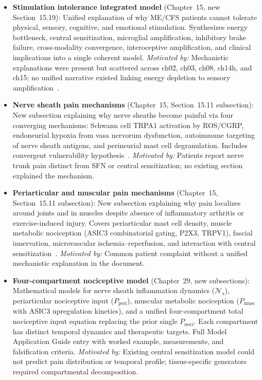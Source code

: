 \begin{itemize}
  \item \textbf{Stimulation intolerance integrated model} (Chapter~15, new
    Section~15.19): Unified explanation of why ME/CFS patients cannot tolerate
    physical, sensory, cognitive, and emotional stimulation. Synthesizes energy
    bottleneck, central sensitization, microglial amplification, inhibitory brake
    failure, cross-modality convergence, interoceptive amplification, and clinical
    implications into a single coherent model.
    \textit{Motivated by:} Mechanistic explanations were present but scattered
    across ch02, ch03, ch08, ch14h, and ch15; no unified narrative existed linking
    energy depletion to sensory
    amplification~\cite{RenzPolster2022,Nijs2017neuroinflammation,Baraniuk2025NociplasticMECFS}.

  \item \textbf{Nerve sheath pain mechanisms} (Chapter~15,
    Section~15.11 subsection): New subsection explaining why nerve sheaths become
    painful via four converging mechanisms: Schwann cell TRPA1 activation by
    ROS/CGRP, endoneurial hypoxia from vasa nervorum dysfunction, autoimmune
    targeting of nerve sheath antigens, and perineurial mast cell degranulation.
    Includes convergent vulnerability
    hypothesis~\cite{heng2025mecfs,Oaklander2016autoimmuneSFN,Oaklander2022SFN}.
    \textit{Motivated by:} Patients report nerve trunk pain distinct from SFN or
    central sensitization; no existing section explained the mechanism.

  \item \textbf{Periarticular and muscular pain mechanisms} (Chapter~15,
    Section~15.11 subsection): New subsection explaining why pain localizes around
    joints and in muscles despite absence of inflammatory arthritis or
    exercise-induced injury. Covers periarticular mast cell density, muscle
    metabolic nociception (ASIC3 combinatorial gating, P2X3, TRPV1), fascial
    innervation, microvascular ischemia--reperfusion, and interaction with central
    sensitization~\cite{Lien2019lactate,Jammes2021muscle,Nijs2012painCFS}.
    \textit{Motivated by:} Common patient complaint without a unified mechanistic
    explanation in the document.

  \item \textbf{Four-compartment nociceptive model} (Chapter~29, new
    subsections): Mathematical models for nerve sheath inflammation dynamics
    ($\mathcal{N}_s$), periarticular nociceptive input ($P_{\text{peri}}$),
    muscular metabolic nociception ($P_{\text{musc}}$ with ASIC3 upregulation
    kinetics), and a unified four-compartment total nociceptive input equation
    replacing the prior single $P_{\text{noci}}$. Each compartment has distinct
    temporal dynamics and therapeutic targets. Full Model Application Guide entry
    with worked example, measurements, and falsification criteria.
    \textit{Motivated by:} Existing central sensitization model could not predict
    pain distribution or temporal profile; tissue-specific generators required
    compartmental decomposition.


\end{itemize}
